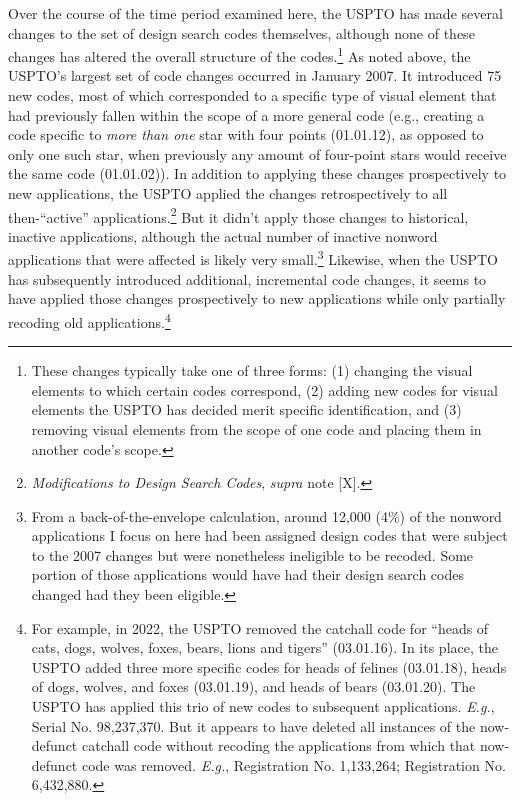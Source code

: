 \documentclass[letterpaper, 11pt, oneside]{article}
\begin{document}
\begin{enumerate}
Over the course of the time period examined here, the USPTO has made several changes to the set of design search codes themselves, although none of these changes has altered the overall structure of the codes.\footnote{These changes typically take one of three forms: (1) changing the visual elements to which certain codes correspond, (2) adding new codes for visual elements the USPTO has decided merit specific identification, and (3) removing visual elements from the scope of one code and placing them in another code's scope.} As noted above, the USPTO's largest set of code changes occurred in January 2007. It introduced 75 new codes, most of which corresponded to a specific type of visual element that had previously fallen within the scope of a more general code (e.g., creating a code specific to \emph{more than one} star with four points (01.01.12), as opposed to only one such star, when previously any amount of four-point stars would receive the same code (01.01.02)). In addition to applying these changes prospectively to new applications, the USPTO applied the changes retrospectively to all then-``active'' applications.\footnote{\textit{Modifications to Design Search Codes}, \textit{supra} note [X].} But it didn't apply those changes to historical, inactive applications, although the actual number of inactive nonword applications that were affected is likely very small.\footnote{From a back-of-the-envelope calculation, around 12,000 (4\%) of the nonword applications I focus on here had been assigned design codes that were subject to the 2007 changes but were nonetheless ineligible to be recoded. Some portion of those applications would have had their design search codes changed had they been eligible.} Likewise, when the USPTO has subsequently introduced additional, incremental code changes, it seems to have applied those changes prospectively to new applications while only partially recoding old applications.\footnote{For example, in 2022, the USPTO removed the catchall code for ``heads of cats, dogs, wolves, foxes, bears, lions and tigers'' (03.01.16). In its place, the USPTO added three more specific codes for heads of felines (03.01.18), heads of dogs, wolves, and foxes (03.01.19), and heads of bears (03.01.20). The USPTO has applied this trio of new codes to subsequent applications. \textit{E.g.}, Serial No. 98,237,370. But it appears to have deleted all instances of the now-defunct catchall code without recoding the applications from which that now-defunct code was removed. \textit{E.g.}, Registration No. 1,133,264; Registration No. 6,432,880.}


\end{enumerate}
\end{document}
